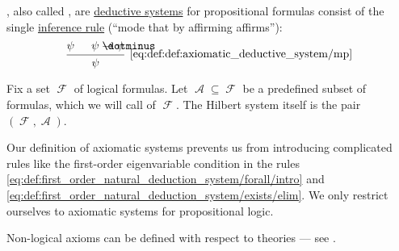 \begin{definition}\label{def:axiomatic_deductive_system}
  , also called , are \hyperref[def:deductive_system]{deductive systems} for propositional formulas consist of the single \hyperref[con:judgment/inference_rule]{inference rule}  (\enquote{mode that by affirming affirms}):
  \begin{equation*}\taglabel[\logic{MP}]{eq:def:def:axiomatic_deductive_system/mp}
    \begin{prooftree}
      \hypo{ \psi }
      \hypo{ \psi \synimplies \psi }
      \infer2[\ref{eq:def:def:axiomatic_deductive_system/mp}]{ \psi }
    \end{prooftree}
  \end{equation*}

  Fix a set \( \mscrF \) of logical formulas. Let \( \mscrA \subseteq \mscrF \) be a predefined subset of formulas, which we will call  of \( \mscrF \). The Hilbert system itself is the pair \( (\mscrF, \mscrA) \).
\end{definition}
\begin{comments}
  \item Our definition of axiomatic systems prevents us from introducing complicated rules like the first-order eigenvariable condition in the rules \eqref{eq:def:first_order_natural_deduction_system/forall/intro} and \eqref{eq:def:first_order_natural_deduction_system/exists/elim}. We only restrict ourselves to axiomatic systems for propositional logic.

  \item Non-logical axioms can be defined with respect to theories --- see .
\end{comments}

